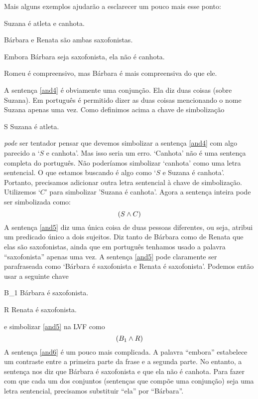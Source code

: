 Mais alguns exemplos ajudarão a esclarecer um pouco mais esse ponto:
	\begin{earg}
		\item[\ex{and4}]Suzana é atleta e canhota.
		\item[\ex{and5}]Bárbara e Renata são ambas saxofonistas.
		\item[\ex{and6}]Embora Bárbara seja saxofonista, ela não é canhota.
		\item[\ex{and7}]Romeu é compreensivo, mas Bárbara é mais compreensiva do que ele.
	\end{earg}
A sentença \ref{and4} é obviamente uma conjunção.
Ela diz duas coisas (sobre Suzana).
Em português é permitido dizer as duas coisas mencionando o nome Suzana apenas uma vez.
Como definimos acima a chave de simbolização 
	\begin{ekey}
		\item[S] Suzana é atleta.
	\end{ekey}
\emph{pode} ser tentador pensar que devemos simbolizar a sentença \ref{and4} com algo parecido a `$S$ e canhota'.
Mas isso seria um erro.
`Canhota' não é uma sentença completa do português.
Não poderíamos simbolizar `canhota' como uma letra sentencial.
O que estamos buscando é algo como `$S$ e Suzana é canhota'.
Portanto, precisamos adicionar outra letra sentencial à chave de simbolização. Utilizemos `$C$' para simbolizar 'Suzana é canhota'.
Agora a sentença inteira pode ser simbolizada como:
$$(S \wedge C)$$	
A sentença \ref{and5} diz uma única coisa de duas pessoas diferentes, ou seja, atribui um predicado único a dois sujeitos.
Diz tanto de Bárbara como de Renata que elas são saxofonistas, ainda que em português tenhamos usado a palavra ``saxofonista'' apenas uma vez.
A sentença \ref{and5} pode claramente ser parafraseada como `Bárbara é saxofonista e Renata é saxofonista'.
Podemos então usar a seguinte chave
	\begin{ekey}
		\item[B_1] Bárbara é saxofonista.
		\item[R] Renata é saxofonista.
	\end{ekey}
e simbolizar \ref{and5} na LVF como
$$(B_1 \wedge R)$$
A sentença \ref {and6} é um pouco mais complicada.
A palavra ``embora'' estabelece um contraste entre a primeira parte da frase e a segunda parte.
No entanto, a sentença nos diz que Bárbara é saxofonista e que ela não é canhota.
Para fazer com que cada um dos conjuntos (sentenças que compõe uma conjunção) seja uma letra sentencial, precisamos substituir ``ela'' por ``Bárbara''.
